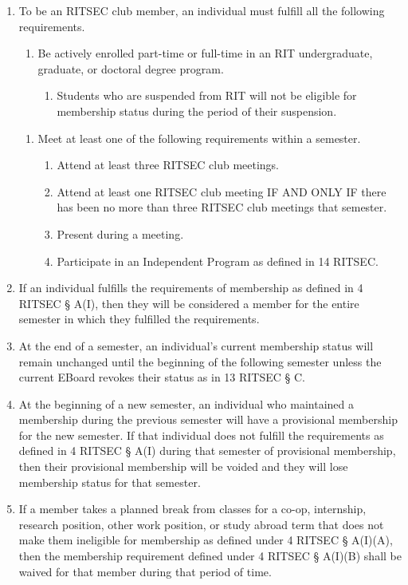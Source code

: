 \documentclass{article}
\begin{document}
\begin{enumerate}
  \item To be an RITSEC club member, an individual must fulfill all the
    following requirements.
  \begin{enumerate}
    \item Be actively enrolled part-time or full-time in an RIT undergraduate,
      graduate, or doctoral degree program.
    \begin{enumerate}
      \item Students who are suspended from RIT will not be eligible for
        membership status during the period of their suspension.
    \end{enumerate}
  \end{enumerate}
  \begin{enumerate}
    \item Meet at least one of the following requirements within a semester.
    \begin{enumerate}
      \item Attend at least three RITSEC club meetings.
      \item Attend at least one RITSEC club meeting IF AND ONLY IF there has
        been no more than three RITSEC club meetings that semester.
      \item Present during a meeting.
      \item Participate in an Independent Program as defined in 14 RITSEC.
    \end{enumerate}
  \end{enumerate}
  \item If an individual fulfills the requirements of membership as defined in
    4 RITSEC § A(I), then they will be considered a member for the entire
    semester in which they fulfilled the requirements.
  \item At the end of a semester, an individual's current membership status
    will remain unchanged until the beginning of the following semester unless
    the current EBoard revokes their status as in 13 RITSEC § C.
  \item At the beginning of a new semester, an individual who maintained a
    membership during the previous semester will have a provisional membership
    for the new semester. If that individual does not fulfill the requirements
    as defined in 4 RITSEC § A(I) during that semester of provisional
    membership, then their provisional membership will be voided and they will
    lose membership status for that semester.
  \item If a member takes a planned break from classes for a co-op, internship,
    research position, other work position, or study abroad term that does not
    make them ineligible for membership as defined under 4 RITSEC § A(I)(A),
    then the membership requirement defined under 4 RITSEC § A(I)(B) shall be
    waived for that member during that period of time.
\end{enumerate}
\end{document}
